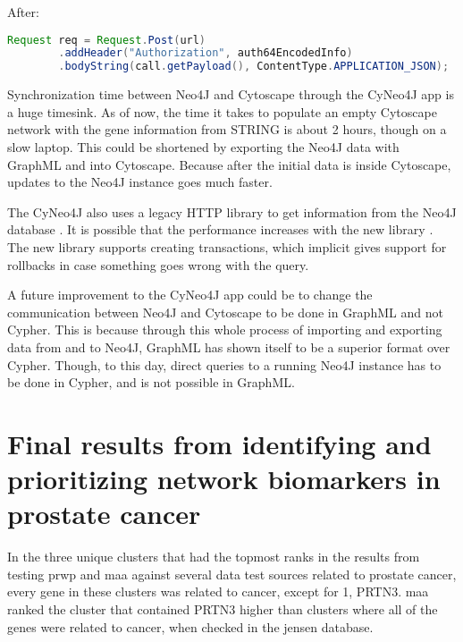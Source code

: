 After:
\begin{lstlisting}[frame=single,language=Java]
Request req = Request.Post(url)
        .addHeader("Authorization", auth64EncodedInfo)
        .bodyString(call.getPayload(), ContentType.APPLICATION_JSON);
\end{lstlisting}

Synchronization time between Neo4J and Cytoscape through the CyNeo4J app is a
huge timesink. As of now, the time it takes to populate an empty Cytoscape
network with the gene information from STRING is about 2 hours, though on a slow
laptop. This could be shortened by exporting the Neo4J data with GraphML and
into Cytoscape. Because after the initial data is inside Cytoscape, updates to
the Neo4J instance goes much faster.

The CyNeo4J also uses a legacy HTTP library to get information from the Neo4J
database \cite{legacy-neo4j}. It is possible that the performance increases with
the new library \cite{transactional-neo4j}. The new library supports creating
transactions, which implicit gives support for rollbacks in case something goes
wrong with the query.

A future improvement to the CyNeo4J app could be to change the communication
between Neo4J and Cytoscape to be done in GraphML and not Cypher. This is
because through this whole process of importing and exporting data from and to
Neo4J, GraphML has shown itself to be a superior format over Cypher. Though, to
this day, direct queries to a running Neo4J instance has to be done in Cypher,
and is not possible in GraphML.

\section{Final results from identifying and prioritizing network biomarkers in prostate cancer}
In the three unique clusters that had the topmost ranks in the results from
testing \gls{prwp} and \gls{maa} against several data test sources related to
prostate cancer, every gene in these clusters was related to cancer, except for
1, PRTN3. \gls{maa} ranked the cluster that contained PRTN3 higher than clusters
where all of the genes were related to cancer, when checked in the \gls{jensen}
database. 
